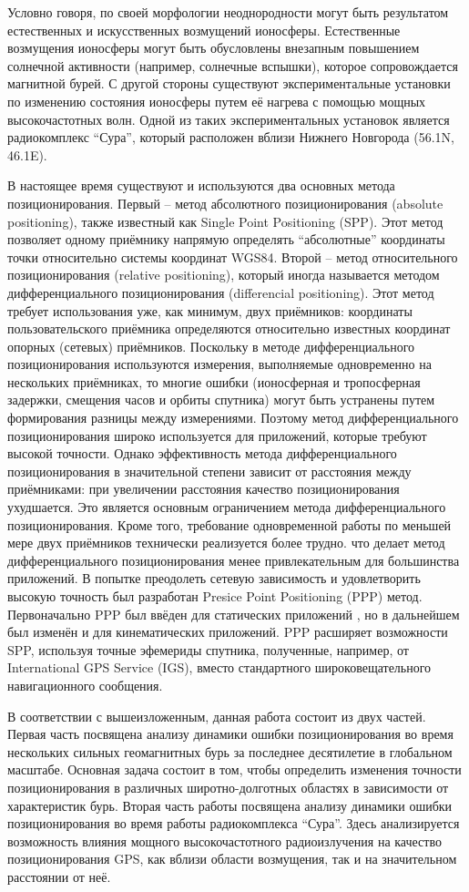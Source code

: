 Условно говоря, по своей морфологии неоднородности могут быть результатом естественных и искусственных возмущений ионосферы.
Естественные возмущения ионосферы могут быть обусловлены внезапным повышением солнечной активности (например, солнечные вспышки), которое сопровождается магнитной бурей.  
С другой стороны существуют экспериментальные установки по изменению состояния ионосферы путем её нагрева с помощью мощных высокочастотных волн. 
Одной из таких экспериментальных установок является радиокомплекс ``Сура'', который расположен вблизи Нижнего Новгорода (56.1\degree N, 46.1\degree E).

В настоящее время существуют и используются два основных метода позиционирования.
Первый -- метод абсолютного позиционирования (absolute positioning), также известный как Single Point Positioning (SPP).
Этот метод позволяет одному приёмнику напрямую определять ``абсолютные'' координаты точки относительно системы координат WGS84.
Второй -- метод относительного позиционирования (relative positioning), который иногда называется методом дифференциального позиционирования (differencial positioning). 
Этот метод требует использования уже, как минимум, двух приёмников: координаты пользовательского приёмника определяются относительно известных координат опорных (сетевых) приёмников.
Поскольку в методе дифференциального позиционирования используются измерения, выполняемые одновременно на нескольких приёмниках, то многие ошибки (ионосферная и тропосферная задержки, смещения часов и орбиты спутника) могут быть устранены путем формирования разницы между измерениями. 
Поэтому метод дифференциального позиционирования широко используется для приложений, которые требуют высокой точности.
Однако эффективность метода дифференциального позиционирования в значительной степени зависит от расстояния между приёмниками: при увеличении расстояния качество позиционирования ухудшается.
Это является основным ограничением метода дифференциального позиционирования. 
Кроме того, требование одновременной работы по меньшей мере двух приёмников технически реализуется более трудно. что делает метод дифференциального позиционирования менее привлекательным для большинства приложений.
В попытке преодолеть сетевую зависимость и удовлетворить высокую точность был разработан Presice Point Positioning (PPP) метод.
Первоначально PPP был ввёден для статических приложений \cite{2}, но в дальнейшем был изменён и для кинематических приложений.
PPP расширяет возможности SPP, используя точные эфемериды спутника, полученные, например, от International GPS Service (IGS), вместо стандартного широковещательного навигационного сообщения.

В соответствии с вышеизложенным, данная работа состоит из двух частей.
Первая часть посвящена анализу динамики ошибки позиционирования во время нескольких сильных геомагнитных бурь за последнее десятилетие в глобальном масштабе.
Основная задача состоит в том, чтобы определить изменения точности позиционирования в различных широтно-долготных областях в зависимости от характеристик бурь.
Вторая часть работы посвящена анализу динамики ошибки позиционирования во время работы радиокомплекса ``Сура''.
Здесь анализируется возможность влияния мощного высокочастотного радиоизлучения на качество позиционирования GPS, как вблизи области возмущения, так и на значительном расстоянии от неё.